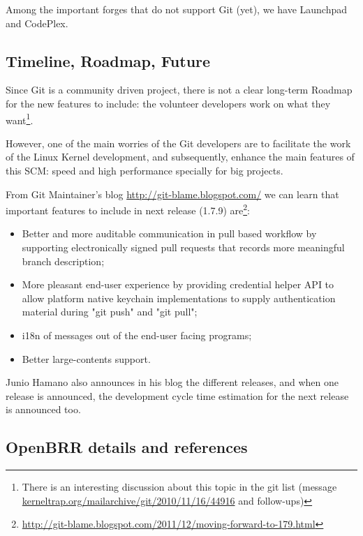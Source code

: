 \documentclass[a4paper,10pt]{article}
\begin{document}
Among the important forges that do not support Git (yet), we have Launchpad and
CodePlex.

\subsection{Timeline, Roadmap, Future}
Since Git is a community driven project, there is not a clear long-term Roadmap
for the new features to include: the volunteer developers work on what they
want\footnote{There is an interesting discussion about this topic in the git
list (message \url{kerneltrap.org/mailarchive/git/2010/11/16/44916} and
follow-ups)}.

However, one of the main worries of the Git developers are to facilitate the
work of the Linux Kernel development, and subsequently, enhance the main
features of this SCM: speed and high performance specially for big projects.

From Git Maintainer's blog \url{http://git-blame.blogspot.com/} we can learn
that important features to include in next release (1.7.9)
are\footnote{\url{
http://git-blame.blogspot.com/2011/12/moving-forward-to-179.html}}:
\begin{itemize} 
 \item Better and more auditable communication in pull based workflow by
supporting electronically signed pull requests that records more meaningful
branch description;
 \item More pleasant end-user experience by providing credential helper API to
allow platform native keychain implementations to supply authentication material
during "git push" and "git pull";
 \item i18n of messages out of the end-user facing programs;
 \item Better large-contents support.
\end{itemize}

Junio Hamano also announces in his blog the different releases, and when one
release is announced, the development cycle time estimation for the next
release is announced too.

\subsection{OpenBRR details and references}
\end{document}
